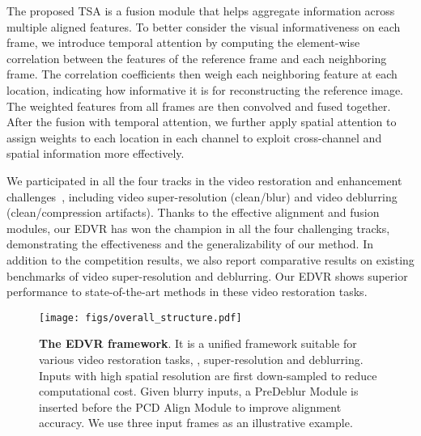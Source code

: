 \documentclass[10pt,twocolumn,letterpaper]{article}
\begin{document}
The proposed TSA is a fusion module that helps aggregate information across multiple aligned features. 
To better consider the visual informativeness on each frame, we introduce temporal attention by computing the element-wise correlation between the features of the reference frame and each neighboring frame. 
The correlation coefficients then weigh each neighboring feature at each location, indicating how informative it is for reconstructing the reference image. The weighted features from all frames are then convolved and fused together. 
After the fusion with temporal attention, we further apply spatial attention to assign weights to each location in each channel to exploit cross-channel and spatial information more effectively.


We participated in all the four tracks in the video restoration and enhancement challenges~\cite{Nah_2019_CVPR_Workshops_SR,Nah_2019_CVPR_Workshops_Deblur}, including video super-resolution (clean/blur) and video deblurring (clean/compression artifacts). 
Thanks to the effective alignment and fusion modules, our EDVR has won the champion in all the four challenging tracks, demonstrating the effectiveness and the generalizability of our method. In addition to the competition results, we also report comparative results on existing benchmarks of video super-resolution and deblurring. Our EDVR shows superior performance to state-of-the-art methods in these video restoration tasks.
 
\begin{figure*}[!t]
	\vspace{-0.4cm}
	\begin{center}
		\texttt{[image: figs/overall\_structure.pdf]}
		\vspace{-0.7cm}
		\caption{\textbf{The EDVR framework}. It is a unified framework suitable for various video restoration tasks, \eg, super-resolution and deblurring. Inputs with high spatial resolution are first down-sampled to reduce computational cost. Given blurry inputs, a PreDeblur Module is inserted before the PCD Align Module to improve alignment accuracy. We use three input frames as an illustrative example.}
		\label{fig:overall_structure}
		\vspace{-0.65cm}
	\end{center}
\end{figure*}
\end{document}
